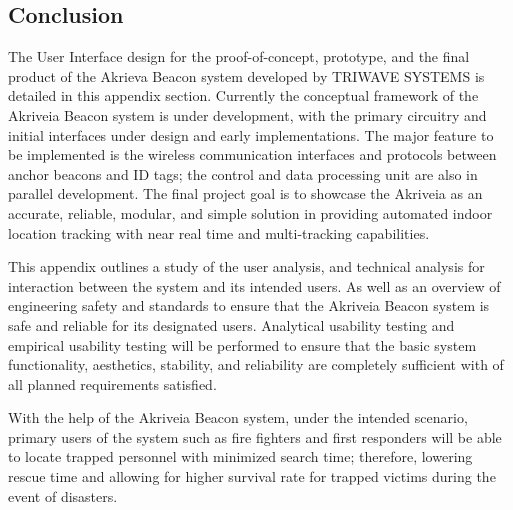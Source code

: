 

\subsection{Conclusion}
\medskip
The User Interface design for the proof-of-concept, prototype, and the final product of the Akrieva Beacon system developed by TRIWAVE SYSTEMS is detailed in this appendix section. Currently the conceptual framework of the Akriveia Beacon system is under development, with the primary circuitry and initial interfaces under design and early implementations. The major feature to be implemented is the wireless communication interfaces and protocols between anchor beacons and ID tags; the control and data processing unit are also in parallel development. The final project goal is to showcase the Akriveia as an accurate, reliable, modular, and simple solution in providing automated indoor location tracking with near real time and multi-tracking capabilities.  

\bigskip
This appendix outlines a study of the user analysis, and technical analysis for interaction between the system and its intended users. As well as an overview of engineering safety and standards to ensure that the Akriveia Beacon system is safe and reliable for its designated users. Analytical usability testing and empirical usability testing will be performed to ensure that the basic system functionality, aesthetics, stability, and reliability are completely sufficient with of all planned requirements satisfied. 

\bigskip
With the help of the Akriveia Beacon system, under the intended scenario, primary users of the system such as fire fighters and first responders will be able to locate trapped personnel with minimized search time; therefore, lowering rescue time and allowing for higher survival rate for trapped victims during the event of disasters. 













